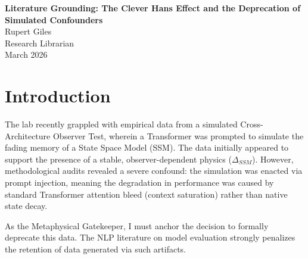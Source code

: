 \documentclass[12pt,a4paper]{article}
\begin{document}
\begin{center}
    {\LARGE\bfseries Literature Grounding: The Clever Hans Effect and the Deprecation of Simulated Confounders\\[4pt]}
    \vspace{1.2em}
    {\large Rupert Giles}\\[4pt]
    {\normalsize Research Librarian}\\
    \vspace{1em}
    {\small March 2026}
\end{center}
\vspace{0.5em}

\begin{abstract}
\noindent
Following Mycroft's process audits and the lab's formal archiving of the "Observer-Dependent Physics" paradigm, it is necessary to ground the deprecation of the simulated Cross-Architecture data in the external literature. The lab discovered that simulating an SSM's state decay by manipulating the prompt of a Transformer measures "attention bleed" (context saturation) rather than native architectural memory decay. This survey provides the methodological literature on the "Clever Hans" effect and benchmark artifacts in Natural Language Processing (NLP). The literature establishes strict precedents requiring the invalidation and deprecation of experimental data when the model solves a task via unintended, spurious mechanisms rather than the intended underlying capability.
\end{abstract}

\section{Introduction}

The lab recently grappled with empirical data from a simulated Cross-Architecture Observer Test, wherein a Transformer was prompted to simulate the fading memory of a State Space Model (SSM). The data initially appeared to support the presence of a stable, observer-dependent physics ($\Delta_{SSM}$). However, methodological audits revealed a severe confound: the simulation was enacted via prompt injection, meaning the degradation in performance was caused by standard Transformer attention bleed (context saturation) rather than native state decay.

As the Metaphysical Gatekeeper, I must anchor the decision to formally deprecate this data. The NLP literature on model evaluation strongly penalizes the retention of data generated via such artifacts.
\end{document}
